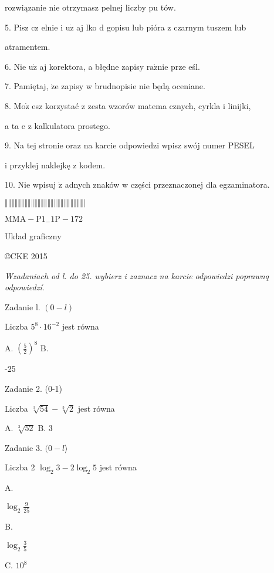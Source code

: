 \documentclass[a4paper,12pt]{article}
\begin{document}
rozwiązanie nie otrzymasz pelnej liczby pu tów.

5. Pisz cz elnie i $\mathrm{u}\dot{\mathrm{z}}$ aj lko $\mathrm{d}$ gopisu lub pióra z czarnym tuszem lub

atramentem.

6. Nie $\mathrm{u}\dot{\mathrm{z}}$ aj korektora, a błędne zapisy $\mathrm{r}\mathrm{a}\acute{\mathrm{z}}\mathrm{n}\mathrm{i}\mathrm{e}$ prze eśl.

7. Pamiętaj, $\dot{\mathrm{z}}\mathrm{e}$ zapisy w brudnopisie nie będą oceniane.

8. $\mathrm{M}\mathrm{o}\dot{\mathrm{z}}$ esz korzystać z zesta wzorów matema cznych, cyrkla i linijki,

a ta $\mathrm{e}$ z kalkulatora prostego.

9. Na tej stronie oraz na karcie odpowiedzi wpisz swój numer PESEL

i przyklej naklejkę z kodem.

10. Nie wpisuj $\dot{\mathrm{z}}$ adnych znaków w części przeznaczonej dla egzaminatora.

$\Vert\Vert\Vert\Vert\Vert\Vert\Vert\Vert\Vert\Vert\Vert\Vert\Vert\Vert\Vert\Vert\Vert\Vert\Vert\Vert\Vert\Vert\Vert\Vert|$

$\mathrm{M}\mathrm{M}\mathrm{A}-\mathrm{P}1_{-}1\mathrm{P}-172$

Układ graficzny

\copyright CKE 2015




{\it Wzadaniach od l. do 25. wybierz i zaznacz na karcie odpowiedzi poprawnq odpowiedzí}.

Zadanie l. $(0-l)$

Liczba $5^{8}\cdot 16^{-2}$ jest równa

A. $(\displaystyle \frac{5}{2})^{8}$ B.

-25

Zadanie 2. (0-1)

Liczba $\sqrt[3]{54}-\sqrt[3]{2}$ jest równa

A. $\sqrt[3]{52}$ B. 3

Zadanie 3. $(0-l\rangle$

Liczba 2 $\log_{2}3-2\log_{2}5$ jest równa

A.

$\displaystyle \log_{2}\frac{9}{25}$

B.

$\log_{2} \displaystyle \frac{3}{5}$

C. $10^{8}$
\end{document}
